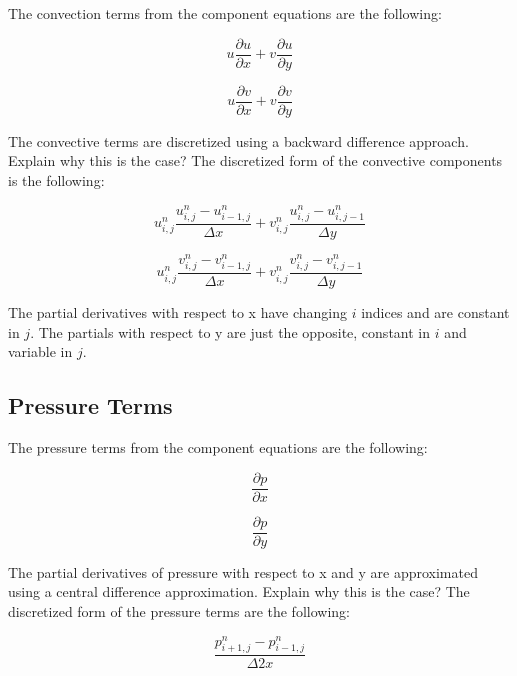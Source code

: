 The convection terms from the component equations are the following:

\begin{equation}
u\frac{\partial{u}}{\partial{x}} + v\frac{\partial{u}}{\partial{y}}
\end{equation}

\begin{equation*}
u\frac{\partial{v}}{\partial{x}} + v\frac{\partial{v}}{\partial{y}}
\end{equation*}

The convective terms are discretized using a backward difference approach.
Explain why this is the case?
The discretized form of the convective components is the following:

\begin{equation}
u_{i,j}^n\frac{u^n_{i,j} - u^n_{i-1,j}}{\Delta{x}} + v_{i,j}^n\frac{u^n_{i,j} - u^n_{i,j-1}}{\Delta{y}}
\end{equation}

\begin{equation*}
u_{i,j}^n\frac{v^n_{i,j} - v^n_{i-1,j}}{\Delta{x}} + v_{i,j}^n\frac{v^n_{i,j} - v^n_{i,j-1}}{\Delta{y}}
\end{equation*}

The partial derivatives with respect to x have changing $i$ indices and are constant in $j$.
The partials with respect to y are just the opposite, constant in $i$ and variable in $j$.

\subsection{Pressure Terms}

The pressure terms from the component equations are the following:

\begin{equation}
\frac{\partial{p}}{\partial{x}}
\end{equation}

\begin{equation*}
\frac{\partial{p}}{\partial{y}}
\end{equation*}

The partial derivatives of pressure with respect to x and y are approximated using a central difference approximation.
Explain why this is the case?
The discretized form of the pressure terms are the following:

\begin{equation}
\frac{p^n_{i+1,j} - p^n_{i-1,j}}{\Delta{2x}} 
\end{equation}

